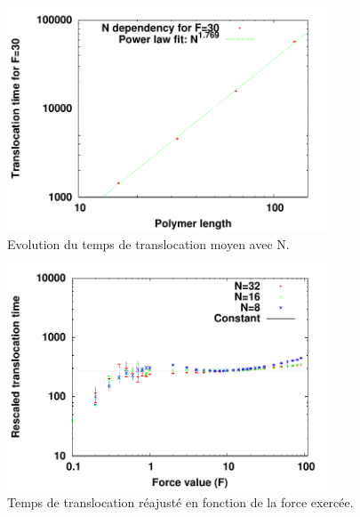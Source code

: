 \documentclass[a4paper,11pt]{article}
\begin{document}
\begin{figure}[H]
\begin{center}
\includegraphics[width=0.85\textwidth]{ndeppolsimple.pdf}


\caption{Evolution du temps de translocation moyen avec N. }
\label{ndeppolsimple}
\end{center}
\end{figure}

\begin{figure}[H]
\begin{center}
\includegraphics[width=0.85\textwidth]{transloctaufrescsimplepol.pdf}


\caption{Temps de translocation réajusté en fonction de la force exercée. }
\label{simplepolrescale}
\end{center}
\end{figure}
\end{document}
